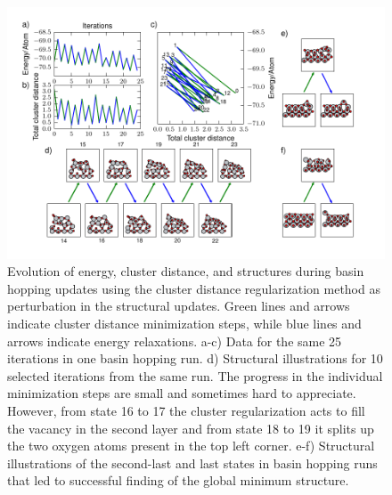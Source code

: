 \documentclass[aip,amsmath,amssymb,reprint]{revtex4-1}
\begin{document}
\begin{figure}[tb]
    \centering
    \includegraphics[width=2.0\columnwidth]{fig6-minimize.pdf}
    \caption{Evolution of energy, cluster distance, and structures
      during basin hopping updates using the cluster distance
      regularization method as perturbation in the structural
      updates. Green lines and arrows indicate cluster distance
      minimization steps, while blue lines and arrows indicate energy
      relaxations. a-c) Data for the same 25 iterations in one basin
      hopping run. d) Structural illustrations for 10 selected
      iterations from the same run. The progress in the individual
      minimization steps are small and sometimes hard to
      appreciate. However, from state 16 to 17 the cluster
      regularization acts to fill the vacancy in the second layer and
      from state 18 to 19 it splits up the two oxygen atoms present in
      the top left corner. e-f) Structural illustrations of the
      second-last and last states in basin hopping runs that led to
      successful finding of the global minimum structure.}
    \label{fig_min}
\end{figure}
\end{document}
